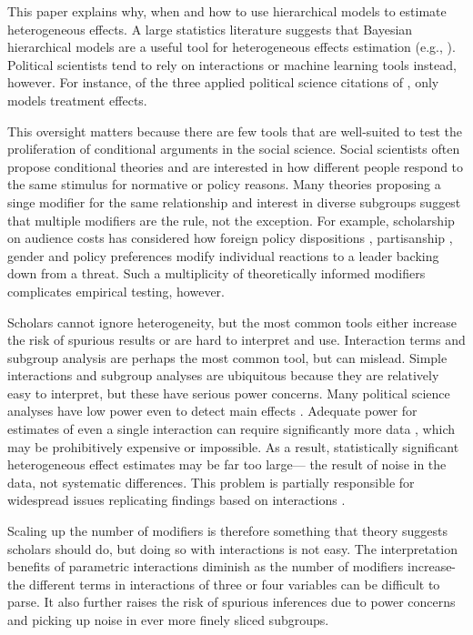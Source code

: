\documentclass[12pt]{article}
\begin{document}
This paper explains why, when and how to use hierarchical models to estimate heterogeneous effects. 
A large statistics literature suggests that Bayesian hierarchical models are a useful tool for  heterogeneous effects estimation (e.g., \cite{FellerGelman2015, McElreath2016, Dorieetal2022}).
Political scientists tend to rely on interactions or machine learning tools instead, however.  
For instance, of the three applied political science citations of \citet{FellerGelman2015}, only \citet{Marquardt2022} models treatment effects. 


This oversight matters because there are few tools that are well-suited to test the proliferation of conditional arguments in the social science. 
Social scientists often propose conditional theories \citep{ClarkGolder2023} and are interested in how different people respond to the same stimulus for normative or policy reasons.
Many theories proposing a singe modifier for the same relationship and interest in diverse subgroups suggest that multiple modifiers are the rule, not the exception.  
For example, scholarship on audience costs has considered how foreign policy dispositions \citep{KertzerBrutger2016}, partisanship \citep{LevenduskyHorowitz2012}, gender \citep{Barnhartetal2020, SchwartzBlair2020} and policy preferences \citep{Chaudoin2014} modify individual reactions to a leader backing down from a threat.
Such a multiplicity of theoretically informed modifiers complicates empirical testing, however. 


Scholars cannot ignore heterogeneity, but the most common tools either increase the risk of spurious results or are hard to interpret and use. 
Interaction terms and subgroup analysis are perhaps the most common tool, but can mislead. 
Simple interactions and subgroup analyses are ubiquitous because they are relatively easy to interpret, but these have serious power concerns. 
Many political science analyses have low power even to detect main effects \citep{ArelBundocketal2022}.
Adequate power for estimates of even a single interaction can require significantly more data \citep{Gelman2018}, which may be prohibitively expensive or impossible.
As a result, statistically significant heterogeneous effect estimates may be far too large--- the result of noise in the data, not systematic differences. 
This problem is partially responsible for widespread issues replicating findings based on interactions \citep{Simmonsetal2011}. 


Scaling up the number of modifiers is therefore something that theory suggests scholars should do, but doing so with interactions is not easy. 
The interpretation benefits of parametric interactions diminish as the number of modifiers increase- the different terms in interactions of three or four variables can be difficult to parse.
It also further raises the risk of spurious inferences due to power concerns and picking up noise in ever more finely sliced subgroups.
\end{document}

